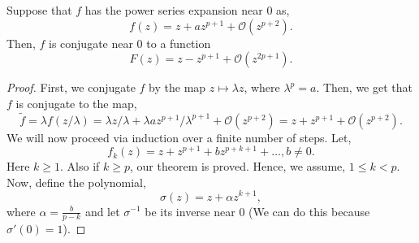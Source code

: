 \begin{theorem}
	Suppose that \( f \) has the power series expansion near \( 0 \) as,\[
		f(z)=z+az^{p+1}+\mathcal{O}(z^{p+2})
	.\] Then, \( f \) is conjugate near \( 0 \) to a function \[
	F(z)=z-z^{p+1}+\mathcal{O}(z^{2p+1})
	.\] 
\end{theorem}
\begin{proof}
	First, we conjugate \( f \) by the map \( z\mapsto \lambda z \), where \( \lambda^p=a \). Then, we get that \( f \) is conjugate to the map, \[ \tilde{f}=\lambda f(z /\lambda)=\lambda z /\lambda+\lambda a z^{p+1} /\lambda^{p+1}+\mathcal{O}(z^{p+2})=z+z^{p+1}+\mathcal{O}(z^{p+2}). \]
	We will now proceed via induction over a finite number of steps. Let, \[
		f_k(z)=z+z^{p+1}+bz^{p+k+1}+\ldots, b\neq 0 
	.\] Here \( k\ge 1 \). Also if \( k\ge p \), our theorem is proved. Hence, we assume, \( 1\le k<p \).\\
	Now, define the polynomial, \[
	\sigma(z)=z+\alpha z^{k+1}
	,\] where \( \alpha=\frac{b}{p-k} \) and let \( \sigma^{-1} \) be its inverse near \( 0 \) (We can do this because \( \sigma'(0)=1 \)). 


\end{proof}
